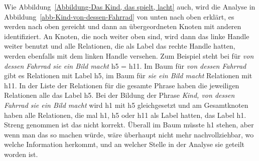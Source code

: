 Wie Abbildung~\ref{Abbildung-Das Kind, das spielt, lacht} auch, wird die Analyse in
Abbildung~\ref{abb-Kind-von-dessen-Fahrrad} von unten 
nach oben erklärt, \dash es werden \ltopwe nach oben gereicht und dann an übergeordneten Knoten mit
anderen \ltopwen identifiziert. An Knoten, die noch weiter oben sind, wird dann das linke Handle
weiter benutzt und alle Relationen, die als Label das rechte Handle hatten, werden ebenfalls mit dem
linken Handle versehen. Zum Beispiel steht bei \ltop für \emph{von dessen Fahrrad sie ein Bild
  macht} h5 = h11. Im Baum für \emph{von dessen Fahrrad} gibt es Relationen mit Label h5, im Baum
für \emph{sie ein Bild macht} Relationen mit h11. In der Liste der Relationen für die gesamte Phrase
haben die jeweiligen Relationen alle das Label h5. Bei der Bildung der Phrase \emph{Kind, von dessen
  Fahrrad sie ein Bild macht} wird h1 mit h5 gleichgesetzt und am Gesamtknoten haben alle
Relationen, die mal h1, h5 oder h11 als Label hatten, das Label h1. Streng genommen ist das nicht
korrekt. Überall im Baum müsste h1 stehen, aber wenn man das so machen würde, wäre überhaupt nicht
mehr nachvollziehbar, wo welche Information herkommt, und an welcher Stelle in der Analyse sie
geteilt worden ist.

